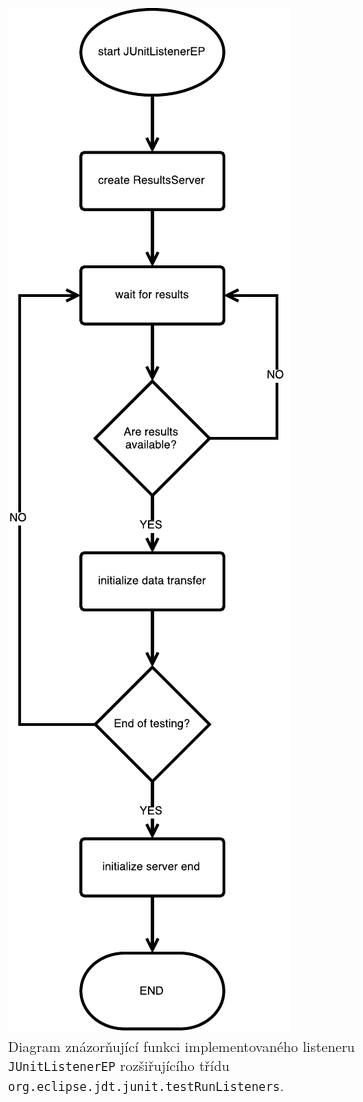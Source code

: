 	\begin{figure}
	  \includegraphics[width=\textwidth, height=0.8\textheight, keepaspectratio, center]{obrazky-figures/inrunjunit_listener_flowchart.pdf}
	  \caption{Diagram znázorňující funkci implementovaného listeneru \texttt{JUnitListenerEP} rozšiřujícího třídu \texttt{org.eclipse.jdt.junit.testRunListeners}.}
	  \label{fig:listener_flowchart}
	\end{figure}
      
